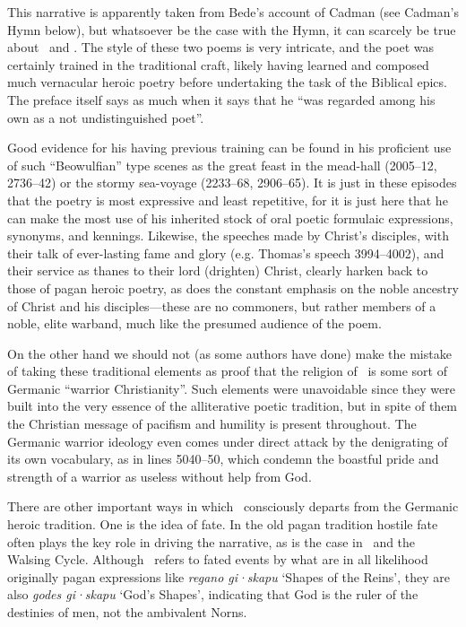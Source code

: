 This narrative is apparently taken from Bede’s account of Cadman (see Cadman’s Hymn below), but whatsoever be the case with the Hymn, it can scarcely be true about \Heliand\ and \SaxonGenesis.  The style of these two poems is very intricate, and the poet was certainly trained in the traditional craft, likely having learned and composed much vernacular heroic poetry before undertaking the task of the Biblical epics.  The preface itself says as much when it says that he “was regarded among his own as a not undistinguished poet”.

Good evidence for his having previous training can be found in his proficient use of such “Beowulfian” type scenes as the great feast in the mead-hall (2005–12, 2736–42) or the stormy sea-voyage (2233–68, 2906–65).  It is just in these episodes that the poetry is most expressive and least repetitive, for it is just here that he can make the most use of his inherited stock of oral poetic formulaic expressions, synonyms, and kennings.  Likewise, the speeches made by Christ’s disciples, with their talk of ever-lasting fame and glory (e.g. Thomas’s speech 3994–4002), and their service as thanes to their lord (drighten) Christ, clearly harken back to those of pagan heroic poetry, as does the constant emphasis on the noble ancestry of Christ and his disciples—these are no commoners, but rather members of a noble, elite warband, much like the presumed audience of the poem.

On the other hand we should not (as some authors have done) make the mistake of taking these traditional elements as proof that the religion of \Heliand\ is some sort of Germanic “warrior Christianity”.  Such elements were unavoidable since they were built into the very essence of the alliterative poetic tradition, but in spite of them the Christian message of pacifism and humility is present throughout.  The Germanic warrior ideology even comes under direct attack by the denigrating of its own vocabulary, as in lines 5040–50, which condemn the boastful pride and strength of a warrior as useless without help from God.

There are other important ways in which \Heliand\ consciously departs from the Germanic heroic tradition.  One is the idea of fate.  In the old pagan tradition hostile fate often plays the key role in driving the narrative, as is the case in \Hildebrandslied\ and the Walsing Cycle.  Although \Heliand\ refers to fated events by what are in all likelihood originally pagan expressions like \emph{regano gi·skapu} ‘Shapes of the Reins’, they are also \emph{godes gi·skapu} ‘God’s Shapes’, indicating that God is the ruler of the destinies of men, not the ambivalent Norns.

